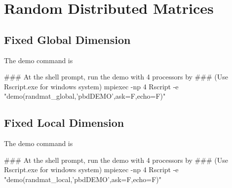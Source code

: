 \section{Random Distributed Matrices}
\label{sec:reader}


\subsection{Fixed Global Dimension}

The demo command is
\begin{Command}
### At the shell prompt, run the demo with 4 processors by
### (Use Rscript.exe for windows system)
mpiexec -np 4 Rscript -e "demo(randmat_global,'pbdDEMO',ask=F,echo=F)"
\end{Command}








\subsection{Fixed Local Dimension}

The demo command is
\begin{Command}
### At the shell prompt, run the demo with 4 processors by
### (Use Rscript.exe for windows system)
mpiexec -np 4 Rscript -e "demo(randmat_local,'pbdDEMO',ask=F,echo=F)"
\end{Command}



